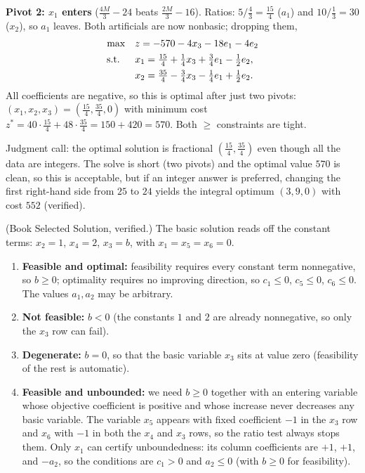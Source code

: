 \textbf{Pivot 2: $x_1$ enters} ($\tfrac{4M}{3} - 24$ beats
$\tfrac{2M}{3} - 16$). Ratios: $5/\tfrac43 = \tfrac{15}{4}$ ($a_1$) and
$10/\tfrac13 = 30$ ($x_2$), so $a_1$ leaves. Both artificials are now
nonbasic; dropping them,
\[
\begin{aligned}
\max\quad & z = -570 - 4x_3 - 18e_1 - 4e_2 \\
\text{s.t.}\;\;\quad & x_1 = \tfrac{15}{4} + \tfrac14 x_3 + \tfrac34 e_1 - \tfrac12 e_2, \\
& x_2 = \tfrac{35}{4} - \tfrac34 x_3 - \tfrac14 e_1 + \tfrac12 e_2.
\end{aligned}
\]
All coefficients are negative, so this is optimal after just two pivots:
$(x_1, x_2, x_3) = \left(\tfrac{15}{4}, \tfrac{35}{4}, 0\right)$ with
minimum cost $z^* = 40 \cdot \tfrac{15}{4} + 48 \cdot \tfrac{35}{4}
= 150 + 420 = 570$. Both $\geq$ constraints are tight.

\begin{qaflag}
Judgment call: the optimal solution is fractional
$\left(\tfrac{15}{4}, \tfrac{35}{4}\right)$ even though all the data are
integers. The solve is short (two pivots) and the optimal value $570$ is
clean, so this is acceptable, but if an integer answer is preferred,
changing the first right-hand side from $25$ to $24$ yields the integral
optimum $(3, 9, 0)$ with cost $552$ (verified).
\end{qaflag}


(Book Selected Solution, verified.) The basic solution reads off the
constant terms: $x_2 = 1$, $x_4 = 2$, $x_3 = b$, with
$x_1 = x_5 = x_6 = 0$.
\begin{enumerate}
\item \textbf{Feasible and optimal:} feasibility requires every constant
term nonnegative, so $b \geq 0$; optimality requires no improving
direction, so $c_1 \leq 0$, $c_5 \leq 0$, $c_6 \leq 0$. The values
$a_1, a_2$ may be arbitrary.
\item \textbf{Not feasible:} $b < 0$ (the constants $1$ and $2$ are
already nonnegative, so only the $x_3$ row can fail).
\item \textbf{Degenerate:} $b = 0$, so that the basic variable $x_3$ sits
at value zero (feasibility of the rest is automatic).
\item \textbf{Feasible and unbounded:} we need $b \geq 0$ together with an
entering variable whose objective coefficient is positive and whose
increase never decreases any basic variable. The variable $x_5$ appears
with fixed coefficient $-1$ in the $x_3$ row and $x_6$ with $-1$ in both
the $x_4$ and $x_3$ rows, so the ratio test always stops them. Only $x_1$
can certify unboundedness: its column coefficients are $+1$, $+1$, and
$-a_2$, so the conditions are $c_1 > 0$ and $a_2 \leq 0$ (with $b \geq 0$
for feasibility).
\end{enumerate}

